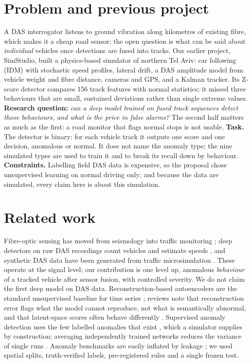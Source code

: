 \documentclass[10pt,a4paper,twocolumn]{article}
\begin{document}
\section{Problem and previous project}
A DAS interrogator listens to ground vibration along kilometres of existing fibre, which makes it a cheap road sensor; the open question is what can be said about \emph{individual} vehicles once detections are fused into tracks. Our earlier project, SimStudio, built a physics-based simulator of northern Tel Aviv: car following (IDM) with stochastic speed profiles, lateral drift, a DAS amplitude model from vehicle weight and fibre distance, cameras and GPS, and a Kalman tracker. Its Z-score detector compares 156 track features with normal statistics; it missed three behaviours that are small, sustained deviations rather than single extreme values. \textbf{Research question:} \emph{can a deep model trained on fused track sequences detect those behaviours, and what is the price in false alarms?} The second half matters as much as the first: a road monitor that flags normal stops is not usable. \textbf{Task.} The detector is binary: for each vehicle track it outputs one score and one decision, anomalous or normal. It does not name the anomaly type; the nine simulated types are used to train it and to break its recall down by behaviour. \textbf{Constraints.} Labelling field DAS data is expensive, so the proposal chose unsupervised learning on normal driving only; and because the data are simulated, every claim here is about this simulation.

\section{Related work}
Fibre-optic sensing has moved from seismology into traffic monitoring \cite{lindsey2021}; deep detectors on raw DAS recordings count vehicles and estimate speeds \cite{ye2023}, and synthetic DAS data have been generated from traffic microsimulation \cite{robles2025}. These operate at the signal level; our contribution is one level up, anomalous \emph{behaviour} of a tracked vehicle after sensor fusion, with controlled severity. We do not claim the first deep model on DAS data. Reconstruction-based autoencoders are the standard unsupervised baseline for time series \cite{sakurada2014,audibert2020}; reviews note that reconstruction error flags what the model cannot reproduce, not what is semantically abnormal, and that latent-space scores often behave differently \cite{ruff2021}. Supervised anomaly detection uses the few labelled anomalies that exist \cite{pang2021}, which a simulator supplies by construction; averaging independently trained networks reduces the variance of single runs \cite{lakshminarayanan2017}. Anomaly benchmarks are easily inflated by leakage \cite{wu2023,kaufman2012}; we used spatial splits, truth-verified labels, pre-registered rules and a single frozen test.
\end{document}
